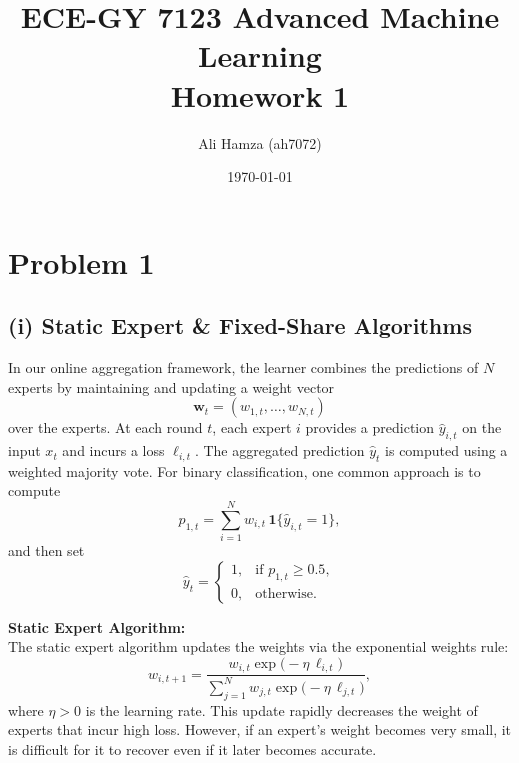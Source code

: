 \documentclass{article}
\title{ECE-GY 7123 Advanced Machine Learning \\ \Large Homework 1}
\author{Ali Hamza (ah7072)}
\date{\today}
\begin{document}
\maketitle
\newpage



\section*{Problem 1}
\subsection*{(i) Static Expert \& Fixed-Share Algorithms}

In our online aggregation framework, the learner combines the predictions of $N$ experts by maintaining and updating a weight vector 
\[
\mathbf{w}_t = \left( w_{1,t}, \ldots, w_{N,t} \right)
\]
over the experts. At each round $t$, each expert $i$ provides a prediction $\hat{y}_{i,t}$ on the input $x_t$ and incurs a loss $\ell_{i,t}$. The aggregated prediction $\hat{y}_t$ is computed using a weighted majority vote. For binary classification, one common approach is to compute
\[
p_{1,t} = \sum_{i=1}^{N} w_{i,t} \, \mathbf{1}\{\hat{y}_{i,t} = 1\},
\]
and then set
\[
\hat{y}_t = \begin{cases} 
1, & \text{if } p_{1,t} \geq 0.5, \\[1mm]
0, & \text{otherwise.}
\end{cases}
\]

\noindent\textbf{Static Expert Algorithm:} \\
The static expert algorithm updates the weights via the exponential weights rule:
\[
w_{i,t+1} = \frac{w_{i,t} \exp\bigl(-\eta\,\ell_{i,t}\bigr)}{\sum_{j=1}^{N} w_{j,t} \exp\bigl(-\eta\,\ell_{j,t}\bigr)},
\]
where $\eta > 0$ is the learning rate. This update rapidly decreases the weight of experts that incur high loss. However, if an expert’s weight becomes very small, it is difficult for it to recover even if it later becomes accurate.\\
\end{document}
